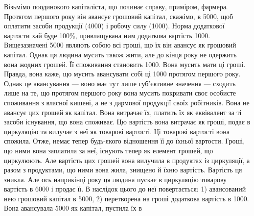 Візьмімо поодинокого капіталіста, що починає справу, приміром,
фармера. Протягом першого року він авансує грошовий капітал, скажімо,
в 5000, щоб оплатити засоби продукції (4000) і робочу
силу (1000). Норма додаткової вартости хай буде 100\%, привлащувана
ним додаткова вартість \deq{} 1000. Вищезазначені 5000 являють собою всі гроші, що їх він авансує як грошовий капітал.
Однак ця людина мусить також жити, але до кінця року не одержить
вона жодних грошей. Її споживання становить 1000. Вона мусить
мати ці гроші. Правда, вона каже, що мусить авансувати собі ці 1000
протягом першого року. Однак це авансування — воно має тут лише
суб’єктивне значення — сходить лише на те, що протягом першого року
вона мусить покривати своє особисте споживання з власної кишені, а не
з дармової продукції своїх робітників. Вона не авансує цих грошей як
капітал. Вона витрачає їх, платить їх як еквівалент за ті засоби існування,
що вона споживає. Цю вартість вона витрачає як гроші, подає в
циркуляцію та вилучає з неї як товарові вартості. Ці товарові вартості
вона спожила. Отже, немає тепер будь-якого відношення її до їхньої
вартости. Гроші, що ними вона заплатила за неї, існують тепер як елемент
грошей, що циркулюють. Але вартість цих грошей вона вилучила
в продуктах із циркуляції, а разом з продуктами, що ними вона жила,
знищено й їхню вартість. Вартість ця зникла. Але ось наприкінці року
ця людина пускає в циркуляцію товарову вартість в 6000 і продає її.
В наслідок цього до неї повертається: 1) авансований нею грошовий
капітал в 5000, 2) перетворена на гроші додаткова вартість в
1000. Вона авансувала 5000 як капітал, пустила їх в
\parbreak{}  %
